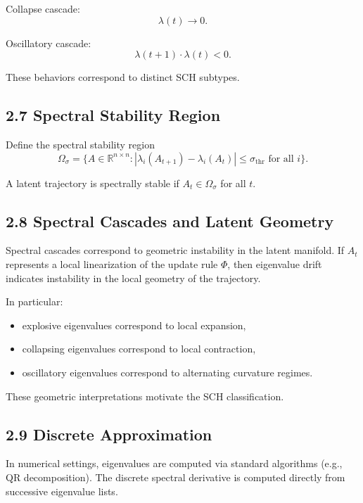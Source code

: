 Collapse cascade:
\[
\lambda(t) \to 0.
\]

Oscillatory cascade:
\[
\lambda(t+1) \cdot \lambda(t) < 0.
\]

These behaviors correspond to distinct SCH subtypes.

\subsection*{2.7 Spectral Stability Region}

Define the spectral stability region
\[
\Omega_{\sigma}
= \{ A \in \mathbb{R}^{n \times n} :
|\lambda_i(A_{t+1}) - \lambda_i(A_t)| \le \sigma_{\mathrm{thr}}
\text{ for all } i \}.
\]

A latent trajectory is spectrally stable if $A_t \in \Omega_{\sigma}$
for all $t$.

\subsection*{2.8 Spectral Cascades and Latent Geometry}

Spectral cascades correspond to geometric instability in the latent
manifold. If $A_t$ represents a local linearization of the update rule
$\Phi$, then eigenvalue drift indicates instability in the local
geometry of the trajectory.

In particular:
\begin{itemize}
\item explosive eigenvalues correspond to local expansion,
\item collapsing eigenvalues correspond to local contraction,
\item oscillatory eigenvalues correspond to alternating curvature regimes.
\end{itemize}

These geometric interpretations motivate the SCH classification.

\subsection*{2.9 Discrete Approximation}

In numerical settings, eigenvalues are computed via standard algorithms
(e.g., QR decomposition). The discrete spectral derivative is computed
directly from successive eigenvalue lists.

